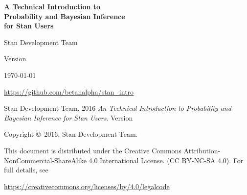 
\thispagestyle{empty}

{ \Huge
\noindent \textbf{A Technical Introduction to \\[3mm]
                           Probability and Bayesian Inference \\[2mm]
                           for Stan Users} 
}

\vspace{5mm}

{ \noindent \Large Stan Development Team }

\vfill

\begin{center}

{ \Large

Version \introversion

\today

\url{https://github.com/betanalpha/stan_intro}

}

\end{center}

\newpage
\thispagestyle{empty}

\mbox{}
\vfill


\noindent Stan Development Team. 2016  
{\it  An Technical Introduction to Probability and Bayesian Inference for Stan Users}. Version \introversion

\vspace{5mm}

\noindent Copyright \copyright \ 2016, Stan Development Team.

\vspace{5mm}

\noindent This document is distributed under the Creative Commons Attribution-NonCommercial-ShareAlike 
4.0 International License. (CC BY-NC-SA 4.0).  For full details, see

\begin{center}
\url{https://creativecommons.org/licenses/by/4.0/legalcode} 
\end{center}
